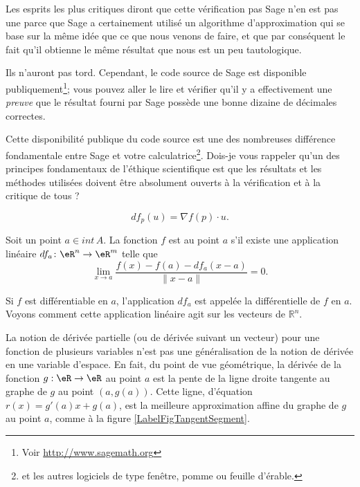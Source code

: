 \begin{remark}
    Les esprits les plus critiques diront que cette vérification pas Sage n'en est pas une parce que Sage a certainement utilisé un algorithme d'approximation qui se base sur la même idée que ce que nous venons de faire, et que par conséquent le fait qu'il obtienne le même résultat que nous est un peu tautologique. 
    
    Ils n'auront pas tord. Cependant, le code source de Sage est disponible publiquement\footnote{Voir \url{http://www.sagemath.org}}; vous pouvez aller le lire et vérifier qu'il y a effectivement une \emph{preuve} que le résultat fourni par Sage possède une bonne dizaine de décimales correctes. 
    
    Cette disponibilité publique du code source est une des nombreuses différence fondamentale entre Sage et votre calculatrice\footnote{et les autres logiciels de type fenêtre, pomme ou feuille d'érable.}. Dois-je vous rappeler qu'un des principes fondamentaux de l'éthique scientifique est que les résultats et les méthodes utilisées doivent être absolument ouverts à la vérification et à la critique de tous ?
\end{remark}

\begin{equation}        \label{Eqdfpunfpdu}
    df_p(u)=\nabla f(p)\cdot u.
\end{equation}

\begin{definition}      \label{DefDifferentiablFnRn}
Soit un point $a \in int\,A$. La fonction $f$ est  au point $a$ s'il existe une application linéaire $df_a\colon \eR^n\to \eR^m$ telle que 
\begin{equation}        \label{EqDefDiffableT}
    \lim_{x\to a} \frac{f(x) - f(a) - df_a (x-a)}{\|x-a\|}=0.
\end{equation}
\end{definition}

Si $f$ est différentiable en $a$, l'application $df_a$ est appelée la différentielle de $f$ en $a$. Voyons comment cette application linéaire agit sur les vecteurs de $\mathbb{R}^n$.

La notion de dérivée partielle (ou de dérivée suivant un vecteur) pour une fonction de plusieurs variables n'est pas une  généralisation de la notion de dérivée en une variable d'espace. En fait, du point de vue géométrique, la dérivée de la fonction $g:\eR\to\eR$ au point $a$ est la pente de la ligne droite tangente au graphe de $g$ au point $(a, g(a))$. Cette ligne, d'équation $r(x)=g'(a)x+g(a)$, est la meilleure approximation affine du graphe de $g$ au point $a$, comme à la figure \ref{LabelFigTangentSegment}.
\newcommand{\CaptionFigTangentSegment}{Tangentes au graphe d'une fonction d'une variable}


